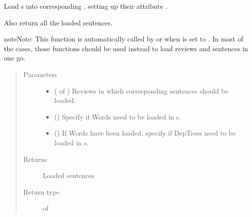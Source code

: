 \documentclass[letterpaper,10pt,english]{sphinxmanual}
\begin{document}

\begin{fulllineitems}
\label{\detokenize{load:loacore.load.sentence_load.load_sentences_in_reviews}}
Load  s into corresponding , setting up their attribute .

Also return all the loaded sentences.

\begin{sphinxadmonition}{note}{Note:}
This function is automatically called by  or 
when  is set to .
In most of the cases, those functions should be used instead to load reviews and sentences in one go.
\end{sphinxadmonition}
\begin{quote}\begin{description}
\item[{Parameters}] \leavevmode\begin{itemize}
\item {} 
 ( of ) \textendash{} Reviews in which corresponding sentences should be loaded.

\item {} 
 () \textendash{} Specify if Words need to be loaded in  s.

\item {} 
 () \textendash{} If Words have been loaded, specify if DepTrees need to be loaded in  s.

\end{itemize}

\item[{Returns}] \leavevmode
Loaded sentences

\item[{Return type}] \leavevmode
{} of 

\end{description}\end{quote}

\end{fulllineitems}
\end{document}
